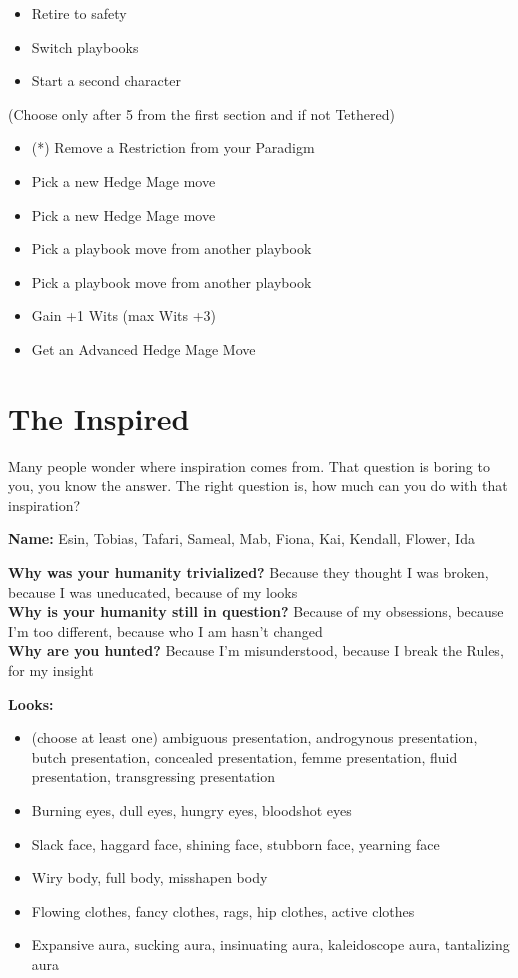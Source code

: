 \documentclass[10pt,twoside,openright]{memoir}
\begin{document}
\begin{itemize}
\tightlist
\item
  Retire to safety
\item
  Switch playbooks
\item
  Start a second character
\end{itemize}

(Choose only after 5 from the first section and if not Tethered)

\begin{itemize}
\tightlist
\item
  (*) Remove a Restriction from your Paradigm
\item
  Pick a new Hedge Mage move
\item
  Pick a new Hedge Mage move
\item
  Pick a playbook move from another playbook
\item
  Pick a playbook move from another playbook
\item
  Gain +1 Wits (max Wits +3)
\item
  Get an Advanced Hedge Mage Move
\end{itemize}

\newpage

\hypertarget{the-inspired}{%
\section{The Inspired}\label{the-inspired}}

Many people wonder where inspiration comes from. That question is boring
to you, you know the answer. The right question is, how much can you do
with that inspiration?

\textbf{Name:} Esin, Tobias, Tafari, Sameal, Mab, Fiona, Kai, Kendall,
Flower, Ida

\textbf{Why was your humanity trivialized?} Because they thought I was
broken, because I was uneducated, because of my looks\\
\textbf{Why is your humanity still in question?} Because of my
obsessions, because I'm too different, because who I am hasn't changed\\
\textbf{Why are you hunted?} Because I'm misunderstood, because I break
the Rules, for my insight

\textbf{Looks:}

\begin{itemize}
\tightlist
\item
  (choose at least one) ambiguous presentation, androgynous
  presentation, butch presentation, concealed presentation, femme
  presentation, fluid presentation, transgressing presentation
\item
  Burning eyes, dull eyes, hungry eyes, bloodshot eyes
\item
  Slack face, haggard face, shining face, stubborn face, yearning face
\item
  Wiry body, full body, misshapen body
\item
  Flowing clothes, fancy clothes, rags, hip clothes, active clothes
\item
  Expansive aura, sucking aura, insinuating aura, kaleidoscope aura,
  tantalizing aura
\end{itemize}
\end{document}
